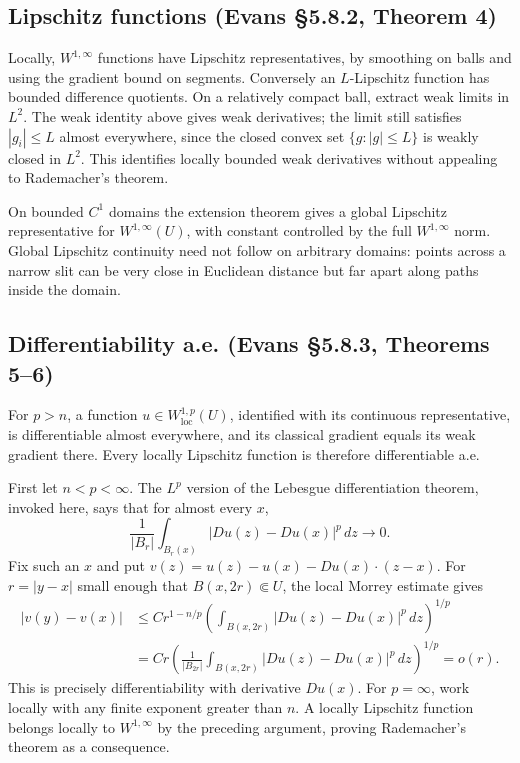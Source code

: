 \subsection{Lipschitz functions (Evans \S5.8.2, Theorem 4)}
Locally, $W^{1,\infty}$ functions have Lipschitz representatives, by
smoothing on balls and using the gradient bound on segments.
Conversely an $L$-Lipschitz function has bounded difference quotients.
On a relatively compact ball, extract weak limits in $L^2$.
The weak identity above gives weak derivatives; the limit still satisfies
$|g_i|\leq L$ almost everywhere, since the closed convex set
$\{g:|g|\leq L\}$ is weakly closed in $L^2$.
This identifies locally bounded weak derivatives without appealing
to Rademacher's theorem.

On bounded $C^1$ domains the extension theorem gives a global Lipschitz
representative for $W^{1,\infty}(U)$, with constant controlled by the
full $W^{1,\infty}$ norm. Global Lipschitz continuity need not follow
on arbitrary domains: points across a narrow slit can be very close
in Euclidean distance but far apart along paths inside the domain.
\Needspace{45mm}

\subsection{Differentiability a.e. (Evans \S5.8.3, Theorems 5--6)}
\begin{theorem}
For $p>n$, a function $u\in W^{1,p}_{\mathrm{loc}}(U)$, identified with
its continuous representative, is differentiable almost everywhere,
and its classical gradient equals its weak gradient there.
Every locally Lipschitz function is therefore differentiable a.e.
\end{theorem}
\begin{expandedproof}
First let $n<p<\infty$. The $L^p$ version of the Lebesgue differentiation
theorem, invoked here, says that for almost every $x$,
\[
 \frac1{|B_r|}\int_{B_r(x)}|Du(z)-Du(x)|^p\,dz\to0.
\]
Fix such an $x$ and put
$v(z)=u(z)-u(x)-Du(x)\cdot(z-x)$.
For $r=|y-x|$ small enough that $B(x,2r)\Subset U$, the local Morrey
estimate gives
\[
 \begin{split}
 |v(y)-v(x)|
 &\leq C r^{1-n/p}
       \left(\int_{B(x,2r)}|Du(z)-Du(x)|^p\,dz\right)^{1/p}\\
 &=Cr\left(\frac1{|B_{2r}|}
       \int_{B(x,2r)}|Du(z)-Du(x)|^p\,dz\right)^{1/p}
 =o(r).
 \end{split}
\]
This is precisely differentiability with derivative $Du(x)$.
For $p=\infty$, work locally with any finite exponent greater than $n$.
A locally Lipschitz function belongs locally to $W^{1,\infty}$ by the
preceding argument, proving Rademacher's theorem as a consequence.
\end{expandedproof}
\Needspace{45mm}

